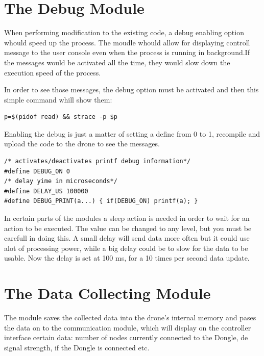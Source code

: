 \section{The Debug Module}

When performing modification to the existing code, a debug enabling option whould speed up the process. The moudle whould allow for displaying controll message to the user console even when the process is running in background.If the messages would be activated all the time, they would slow down the execution speed of the process.

In order to see those messages, the debug option must be activated and then this simple command whill show them:

\begin{lstlisting}
p=$(pidof read) && strace -p $p
\end{lstlisting}

Enabling the debug is just a matter of setting  a define from 0 to 1, recompile and upload the code to the drone to see the messages.

\lstset{numbers=none, mathescape=true, nolol=false,caption=Data Collection use of mutex,label=lst:task}
\begin{lstlisting}
/* activates/deactivates printf debug information*/
#define DEBUG_ON 0
/* delay yime in microseconds*/
#define DELAY_US 100000
#define DEBUG_PRINT(a...) { if(DEBUG_ON) printf(a); }
\end{lstlisting}

In certain parts of the modules a sleep action is needed in order to wait for an action to be executed. The value can be changed to any level, but you must be carefull in doing this. A small delay will send data more often but it could use alot of processing power, while a big delay could be to slow for the data to be usable. Now the delay is set at 100 ms, for a 10 times per second data update.



\section{The Data Collecting Module}

The module saves the collected data into the drone's internal memory and pases the data on to the communication module, which will display on the controller interface certain data: number of nodes currently connected to the Dongle, de signal strength, if the Dongle is connected etc.

